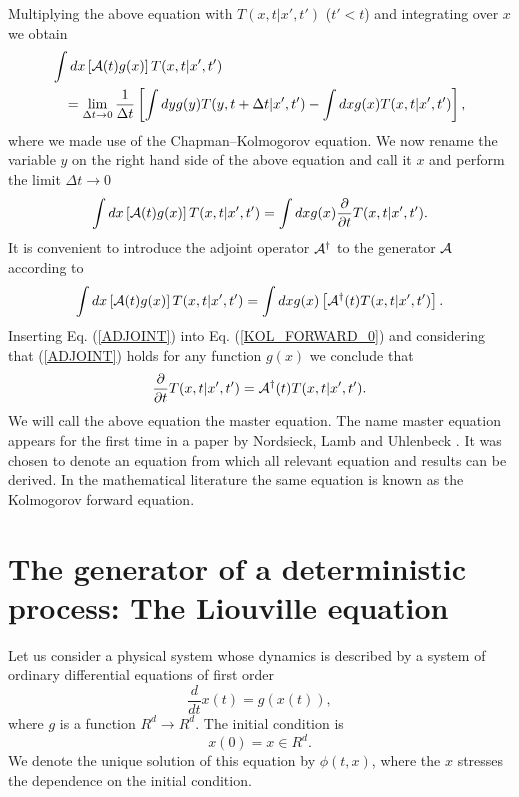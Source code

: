 Multiplying the above equation with $T(x,t|x',t')$ ($t'<t$) and 
integrating over $x$ we obtain
\begin{eqnarray*}
\lefteqn{\int dx \left[ {\cal{A}}(t) g(x) \right] T(x,t|x',t')} \\
&& = \lim_{\Delta t \rightarrow 0}
    \frac{1}{\Delta t} 
    \left[\int dy g(y)T(y,t+\Delta t|x',t') - 
        \int dx g(x) T(x,t|x',t')  \right],
\end{eqnarray*}
where we made use of the Chapman--Kolmogorov equation.
We now rename the variable $y$ on the right hand side of the above 
equation and call it $x$ and perform the limit $\Delta t \rightarrow 
0$
\begin{equation}
\label{KOL_FORWARD_0}
\int dx \left[ {\cal{A}}(t) g(x) \right] T(x,t|x',t') =
  \int dx g(x) \frac{\partial}{\partial t} T(x,t|x',t').
\end{equation}
It is convenient to introduce the adjoint operator ${\cal{A}}^{\dagger}$
to the generator ${\cal{A}}$ according to
\begin{equation}
\label{ADJOINT}
\int dx \left[ {\cal{A}}(t) g(x) \right] T(x,t|x',t') =
\int dx g(x) \left[ {\cal{A}}^{\dagger}(t)  T(x,t|x',t') \right].
\end{equation}
Inserting Eq. (\ref{ADJOINT}) into Eq. (\ref{KOL_FORWARD_0})
and considering that (\ref{ADJOINT}) holds for any 
function $g(x)$ we conclude that
\begin{equation}
\label{KOL_FORWARD}
\frac{\partial}{\partial t} T(x,t|x',t') =
{\cal{A}}^{\dagger}(t) T(x,t|x',t').
\end{equation}
We will call the above equation the master equation.
The name master equation appears for the first time in a paper by
Nordsieck, Lamb and Uhlenbeck \cite{NORDSIECK}. 
It was chosen to denote an equation from which
all relevant equation and results can be derived. 
In the mathematical literature the 
same equation  is known as the Kolmogorov forward
equation.

\section{The generator of a deterministic process: The Liouville 
equation}

Let us consider a physical system whose dynamics is described
by a system of ordinary differential equations of first order
\begin{equation}
\label{ORDINARY_DIFF}
\frac{d}{dt} x(t) = g(x(t)),
\end{equation}
where $g$ is a function $R^d \rightarrow R^d$. The initial 
condition is
\begin{equation*}
x(0) = x \in R^d.
\end{equation*}
We denote the unique solution of this equation by $\phi(t,x)$,
where the $x$ stresses the dependence on the initial condition.

